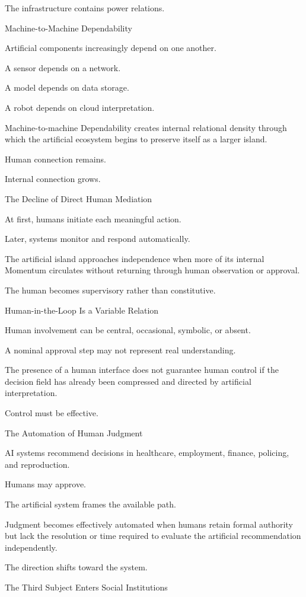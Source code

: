 The infrastructure contains power relations.

Machine-to-Machine Dependability

Artificial components increasingly depend on one another.

A sensor depends on a network.

A model depends on data storage.

A robot depends on cloud interpretation.

Machine-to-machine Dependability creates internal relational density through which the artificial ecosystem begins to preserve itself as a larger island.

Human connection remains.

Internal connection grows.

The Decline of Direct Human Mediation

At first, humans initiate each meaningful action.

Later, systems monitor and respond automatically.

The artificial island approaches independence when more of its internal Momentum circulates without returning through human observation or approval.

The human becomes supervisory rather than constitutive.

Human-in-the-Loop Is a Variable Relation

Human involvement can be central, occasional, symbolic, or absent.

A nominal approval step may not represent real understanding.

The presence of a human interface does not guarantee human control if the decision field has already been compressed and directed by artificial interpretation.

Control must be effective.

The Automation of Human Judgment

AI systems recommend decisions in healthcare, employment, finance, policing, and reproduction.

Humans may approve.

The artificial system frames the available path.

Judgment becomes effectively automated when humans retain formal authority but lack the resolution or time required to evaluate the artificial recommendation independently.

The direction shifts toward the system.

The Third Subject Enters Social Institutions

